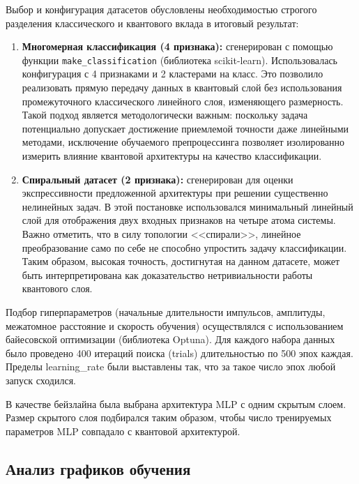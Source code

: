Выбор и конфигурация датасетов обусловлены необходимостью строгого разделения классического и квантового вклада в итоговый результат:
\begin{enumerate}
    \item \textbf{Многомерная классификация (4 признака):} сгенерирован с помощью функции \texttt{make\_classification} (библиотека scikit-learn). Использовалась конфигурация с 4 признаками и 2 кластерами на класс. Это позволило реализовать прямую передачу данных в квантовый слой без использования промежуточного классического линейного слоя, изменяющего размерность. Такой подход является методологически важным: поскольку задача потенциально допускает достижение приемлемой точности даже линейными методами, исключение обучаемого препроцессинга позволяет изолированно измерить влияние квантовой архитектуры на качество классификации.
    \item \textbf{Спиральный датасет (2 признака):} сгенерирован для оценки экспрессивности предложенной архитектуры при решении существенно нелинейных задач. В этой постановке использовался минимальный линейный слой для отображения двух входных признаков на четыре атома системы. Важно отметить, что в силу топологии <<спирали>>, линейное преобразование само по себе не способно упростить задачу классификации. Таким образом, высокая точность, достигнутая на данном датасете, может быть интерпретирована как доказательство нетривиальности работы квантового слоя.
\end{enumerate}

Подбор гиперпараметров (начальные длительности импульсов, амплитуды, межатомное расстояние и скорость обучения) осуществлялся с использованием байесовской оптимизации (библиотека Optuna). Для каждого набора данных было проведено 400 итераций поиска (trials) длительностью по 500 эпох каждая. Пределы learning\_rate были выставлены так, что за такое число эпох любой запуск сходился.

В качестве бейзлайна была выбрана архитектура MLP с одним скрытым слоем. Размер скрытого слоя подбирался таким образом, чтобы число тренируемых параметров MLP совпадало с квантовой архитектурой.

\subsection{Анализ графиков обучения}

